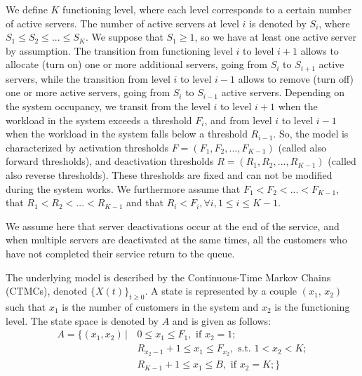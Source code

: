 \documentclass[conference]{IEEEtran}
\begin{document}
We define   $K$ functioning level, where each level corresponds to a certain number of active servers. The number of active servers at level $i$ is 
denoted by $S_i$, where $S_{1} \leq S_{2} \leq ... \leq S_{K}$. We suppose that $S_1 \geq 1$, so we have  at least  one active server by assumption.
The transition from functioning level $i$ to level $i+1$ allows to allocate (turn on) one or more additional servers, going from 
$S_i$ to $S_{i+1}$ active servers, while the transition from level $i$ to level $i-1$ allows to remove (turn off) one or more active servers, 
going from $S_i$ to $S_{i-1}$ active servers. Depending on the system occupancy, we transit from the level $i$ to level $i+1$ when the workload in 
the system exceeds a threshold $F_{i}$, and from level $i$ to level $i-1$ when the workload in the system falls below a threshold  $R_{i-1}$. 
So, the model is characterized by activation thresholds  $F=(F_{1}, F_{2}, ..., F_{K-1})$ (called also forward thresholds), and deactivation 
thresholds $R=(R_{1}, R_{2}, ..., R_{K-1})$ (called also reverse thresholds). 
These thresholds are fixed and can not be modified during the system works.
We furthermore assume  that $F_{1}<F_{2}< ...<F_{K-1}$, that $R_{1}<R_{2}< ...<R_{K-1}$ and that $R_{i}<F_{i}, \forall i, 1 \leq i \leq K-1$.

We assume here that server deactivations occur at the end of the service, and when multiple servers are deactivated at the same times, 
all the customers who have not completed their service return to the queue.



The underlying model is  described by the Continuous-Time Markov Chains (CTMCs), denoted   $\{X(t)\}_{t \geq 0}$.
A state is represented by a couple $(x_{1},\,x_{2})$ such that $x_{1}$ is the number of customers in the system and $x_{2}$ is the functioning level.
The state space is denoted by $A$ and is given as follows:
\begin{align*}
A=\{(x_{1},x_{2}) \, | \,  & 0 \leq x_{1} \leq F_{1},  \text{ if } x_{2}=1 ; \\
                           & R_{x_2-1}+1 \leq x_{1} \leq F_{x_2}, \text{ s.t. } 1 < x_2 < K ; \\
                           & R_{K-1}+1 \leq x_{1} \leq B,  \text{ if } x_{2}=K;
\}
\end{align*}
\end{document}
